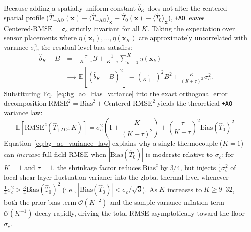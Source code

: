 Because adding a spatially uniform constant $\hat{b}_K$ does not alter the centered spatial profile ($\hat{T}_{\text{+AO}}(\mathbf{x}) - \langle \hat{T}_{\text{+AO}} \rangle_{\mathbf{x}} \equiv \hat{T}_0(\mathbf{x}) - \langle \hat{T}_0 \rangle_{\mathbf{x}}$), \texttt{+AO} leaves $\text{Centered-RMSE} = \sigma_c$ strictly invariant for all $K$. Taking the expectation over sensor placements where $\eta(\mathbf{x}_1), \dots, \eta(\mathbf{x}_K)$ are approximately uncorrelated with variance $\sigma_c^2$, the residual level bias satisfies:
\begin{equation}
\begin{aligned}
    \hat{b}_K - B &= -\frac{\tau}{K + \tau} B + \frac{1}{K + \tau} \sum_{k=1}^K \eta(\mathbf{x}_k) \\
    &\implies \mathbb{E}\!\left[(\hat{b}_K - B)^2\right] = \left(\frac{\tau}{K + \tau}\right)^{\!2} B^2 + \frac{K}{(K + \tau)^2}\,\sigma_c^2.
\end{aligned}
\label{eq:bg_ao_bias_variance}
\end{equation}
Substituting Eq.~\eqref{eq:bg_ao_bias_variance} into the exact orthogonal error decomposition $\text{RMSE}^2 = \text{Bias}^2 + \text{Centered-RMSE}^2$ yields the theoretical \texttt{+AO} variance law:
\begin{equation}
    \mathbb{E}\!\left[\text{RMSE}^2(\hat{T}_{\text{+AO}}; K)\right] = \sigma_c^2 \!\left(1 + \frac{K}{(K + \tau)^2}\right) + \left(\frac{\tau}{K + \tau}\right)^{\!2} \text{Bias}(\hat{T}_0)^2.
    \label{eq:bg_ao_variance_law}
\end{equation}
Equation~\eqref{eq:bg_ao_variance_law} explains why a single thermocouple ($K=1$) can \emph{increase} full-field RMSE when $|\text{Bias}(\hat{T}_0)|$ is moderate relative to $\sigma_c$: for $K=1$ and $\tau=1$, the shrinkage factor reduces $\text{Bias}^2$ by $3/4$, but injects $\frac{1}{4}\sigma_c^2$ of local shear-layer fluctuation variance into the global thermal level whenever $\frac{1}{4}\sigma_c^2 > \frac{3}{4}\text{Bias}(\hat{T}_0)^2$ (i.e., $|\text{Bias}(\hat{T}_0)| < \sigma_c / \sqrt{3}$). As $K$ increases to $K \ge 9\text{--}32$, both the prior bias term $\mathcal{O}(K^{-2})$ and the sample-variance inflation term $\mathcal{O}(K^{-1})$ decay rapidly, driving the total RMSE asymptotically toward the floor $\sigma_c$.


